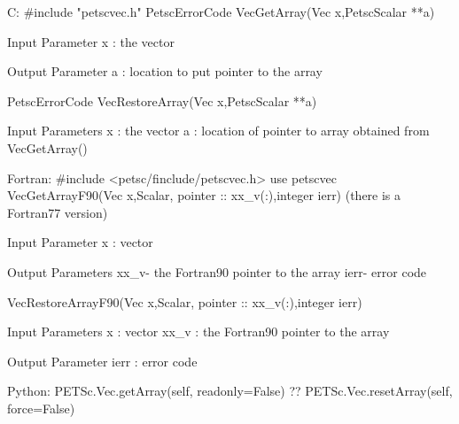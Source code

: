 C:
#include "petscvec.h"
PetscErrorCode VecGetArray(Vec x,PetscScalar **a)

Input Parameter
x : the vector

Output Parameter
a : location to put pointer to the array

PetscErrorCode VecRestoreArray(Vec x,PetscScalar **a)

Input Parameters
x : the vector
a : location of pointer to array obtained from VecGetArray()

Fortran:
#include <petsc/finclude/petscvec.h>
use petscvec
VecGetArrayF90(Vec x,{Scalar, pointer :: xx_v(:)},integer ierr)
(there is a Fortran77 version)

Input Parameter
x : vector

Output Parameters
xx_v- the Fortran90 pointer to the array
ierr- error code

VecRestoreArrayF90(Vec x,{Scalar, pointer :: xx_v(:)},integer ierr)

Input Parameters
x : vector
xx_v : the Fortran90 pointer to the array

Output Parameter
ierr : error code 

Python:
PETSc.Vec.getArray(self, readonly=False)
?? PETSc.Vec.resetArray(self, force=False)
